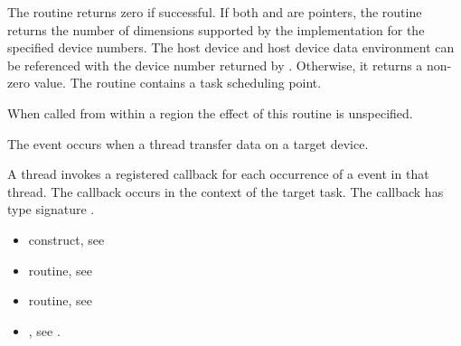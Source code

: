 The routine returns zero if successful. If both  and  are
 pointers, the routine returns the number of dimensions supported
by the implementation for the specified device numbers. The host device and
host device data environment can be referenced with the device number returned
by .  Otherwise, it returns a non-zero value. The
routine contains a task scheduling point.

When called from within a  region 
the effect of this routine is unspecified.


\events
The  event occurs when a thread transfer data on a target device.

\tools

A thread invokes a registered 
callback for each occurrence of a  event in that thread. 
The callback occurs in the context of the target task.  The callback has type signature
. 


\crossreferences
\begin{itemize}
\item {} construct, see 

\item {} routine, see 

\item {} routine, see 


\item {}, see 
.

\end{itemize}

